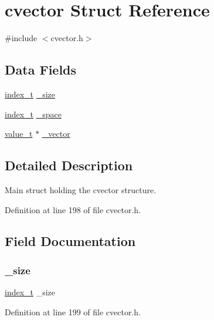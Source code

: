 \hypertarget{structcvector}{}\section{cvector Struct Reference}
\label{structcvector}


{\ttfamily \#include $<$cvector.\+h$>$}

\subsection*{Data Fields}
\begin{DoxyCompactItemize}
\item 
\hyperlink{cvector_8h_a05384666b24e4f096243ebf311436ee5}{index\+\_\+t} \hyperlink{structcvector_a44c9984fcdd1c44d35235c67909dcc79}{\+\_\+size}
\item 
\hyperlink{cvector_8h_a05384666b24e4f096243ebf311436ee5}{index\+\_\+t} \hyperlink{structcvector_a5948a8ef12921a8fc535fbcb48d4d4d4}{\+\_\+space}
\item 
\hyperlink{cvector_8h_a02cdeb70a219711c52cec8d6d682048b}{value\+\_\+t} $\ast$ \hyperlink{structcvector_ae60afc8a80c3a6c945520216265ebbe0}{\+\_\+vector}
\end{DoxyCompactItemize}


\subsection{Detailed Description}
Main struct holding the cvector structure. 

Definition at line 198 of file cvector.\+h.



\subsection{Field Documentation}
\mbox{\label{structcvector_a44c9984fcdd1c44d35235c67909dcc79}} 
\subsubsection{\texorpdfstring{\+\_\+size}{\_size}}
{\footnotesize\ttfamily \hyperlink{cvector_8h_a05384666b24e4f096243ebf311436ee5}{index\+\_\+t} \+\_\+size}



Definition at line 199 of file cvector.\+h.

